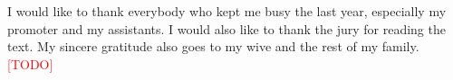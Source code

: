 \documentclass[master=cws,masteroption=ai,english]{kulemt}
\begin{document}
\begin{preface}
  I would like to thank everybody who kept me busy the last year,
  especially my promoter and my assistants. I would also like to thank the
  jury for reading the text. My sincere gratitude also goes to my wive and
  the rest of my family.\textcolor{red}{[TODO]}
\end{preface}

\tableofcontents*






\listoffiguresandtables


\mainmatter








%

\appendixpage*          %
\appendix

% 

\backmatter


\end{document}
